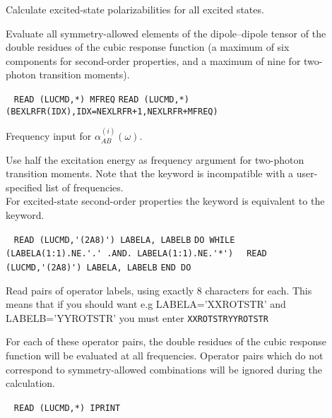 \begin{description}
\item[] 
Calculate excited-state polarizabilities for all excited states.
 
\item[] 
Evaluate all symmetry-allowed elements of the dipole--dipole tensor
of the double residues of the cubic response function 
(a maximum of six components for second-order properties, and a
 maximum of nine for two-photon transition moments).
 
\item[]  \verb| |\newline
\verb|READ (LUCMD,*) MFREQ|\newline
\verb|READ (LUCMD,*) (BEXLRFR(IDX),IDX=NEXLRFR+1,NEXLRFR+MFREQ)|

Frequency input for $\alpha^{(i)}_{AB}(\omega)$.
 
\item[] 
Use half the excitation energy as frequency argument for two-photon
transition moments.
Note that the  keyword is incompatible with a 
user-specified list of frequencies. \\
For excited-state second-order properties the  keyword is
equivalent to the  keyword.
 
\item[] \verb| |\newline
\verb|READ (LUCMD,'(2A8)') LABELA, LABELB|\newline
\verb|DO WHILE (LABELA(1:1).NE.'.' .AND. LABELA(1:1).NE.'*')|\newline
\verb|  READ (LUCMD,'(2A8)') LABELA, LABELB|\newline
\verb|END DO|

Read pairs of operator labels, using exactly 8 characters for each. 
This means that if you should want e.g LABELA='XXROTSTR' and LABELB='YYROTSTR'
you must enter\newline
\verb|XXROTSTRYYROTSTR|

For each of these operator pairs, the double residues of the cubic response
function will be evaluated at all frequencies.
Operator pairs which do not correspond to symmetry-allowed
combinations will be ignored during the calculation.
 
\item[] \verb| |\newline
\verb|READ (LUCMD,*) IPRINT|


\end{description}

